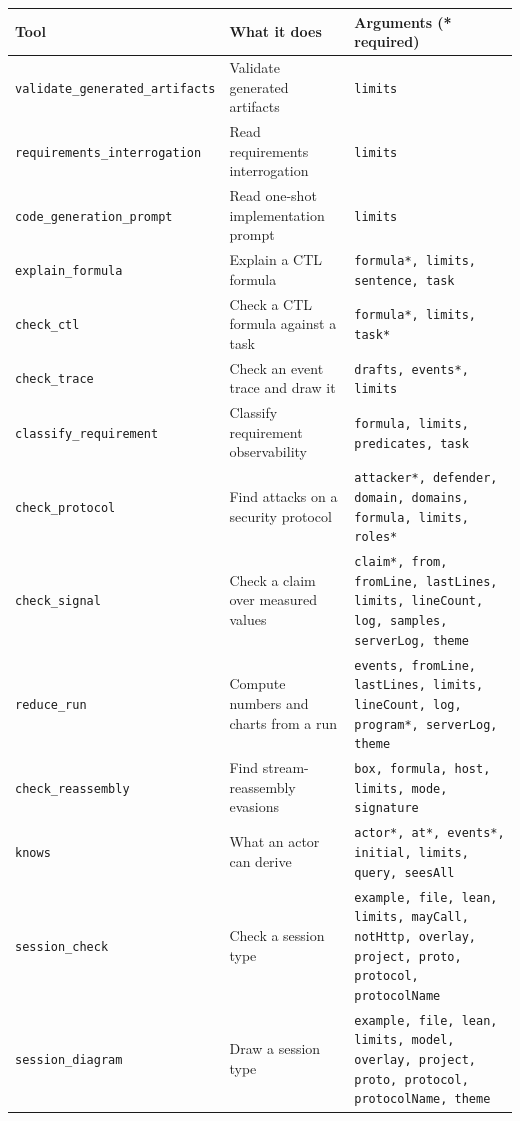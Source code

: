 \begin{tabular}{@{}p{}p{}p{}@{}}
\toprule
Tool & What it does & Arguments (* required) \\
\midrule
\texttt{validate\_\allowbreak{}generated\_\allowbreak{}artifacts} & Validate generated artifacts & \texttt{limits} \\
\texttt{requirements\_\allowbreak{}interrogation} & Read requirements interrogation & \texttt{limits} \\
\texttt{code\_\allowbreak{}generation\_\allowbreak{}prompt} & Read one-shot implementation prompt & \texttt{limits} \\
\texttt{explain\_\allowbreak{}formula} & Explain a CTL formula & \texttt{formula*, limits, sentence, task} \\
\texttt{check\_\allowbreak{}ctl} & Check a CTL formula against a task & \texttt{formula*, limits, task*} \\
\texttt{check\_\allowbreak{}trace} & Check an event trace and draw it & \texttt{drafts, events*, limits} \\
\texttt{classify\_\allowbreak{}requirement} & Classify requirement observability & \texttt{formula, limits, predicates, task} \\
\texttt{check\_\allowbreak{}protocol} & Find attacks on a security protocol & \texttt{attacker*, defender, domain, domains, formula, limits, roles*} \\
\texttt{check\_\allowbreak{}signal} & Check a claim over measured values & \texttt{claim*, from, fromLine, lastLines, limits, lineCount, log, samples, serverLog, theme} \\
\texttt{reduce\_\allowbreak{}run} & Compute numbers and charts from a run & \texttt{events, fromLine, lastLines, limits, lineCount, log, program*, serverLog, theme} \\
\texttt{check\_\allowbreak{}reassembly} & Find stream-reassembly evasions & \texttt{box, formula, host, limits, mode, signature} \\
\texttt{knows} & What an actor can derive & \texttt{actor*, at*, events*, initial, limits, query, seesAll} \\
\texttt{session\_\allowbreak{}check} & Check a session type & \texttt{example, file, lean, limits, mayCall, notHttp, overlay, project, proto, protocol, protocolName} \\
\texttt{session\_\allowbreak{}diagram} & Draw a session type & \texttt{example, file, lean, limits, model, overlay, project, proto, protocol, protocolName, theme} \\

\end{tabular}
